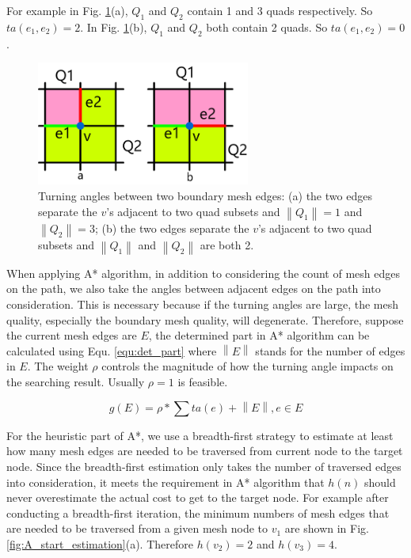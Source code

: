 \documentclass[final,5p,times,twocolumn]{elsarticle}
\begin{document}
For example  in Fig. \ref{fig:turning_angle}(a), $Q_1$ and $Q_2$ contain 1 and 3 quads respectively. So $ta(e_1,e_2)=2$. In Fig. \ref{fig:turning_angle}(b), $Q_1$ and $Q_2$ both contain 2 quads. So $ta(e_1,e_2)=0$.

\begin{figure}[htbp]
\begin{center}
\includegraphics[width=7cm]{rev_figures/turning_angle.png}
\caption{Turning angles between two boundary mesh edges: (a) the two edges separate the $v$'s adjacent to two quad subsets and $\left \| Q_1 \right \|=1$ and $\left \| Q_2 \right \|=3$; (b) the two edges separate the $v$'s adjacent to two quad subsets and $\left \| Q_1 \right \|$ and $\left \| Q_2 \right \|$ are both 2.}
\label{fig:turning_angle}
\end{center}
\end{figure}

When applying A* algorithm, in addition to considering the count of mesh edges on the path, we also take the angles between adjacent edges on the path into consideration. This is necessary because if the turning angles are large, the mesh quality, especially the boundary mesh quality, will degenerate. Therefore, suppose the current mesh edges are $E$, the determined part in A* algorithm can be calculated using Equ. \ref{equ:det_part} where $\left \| E \right \|$ stands for the number of edges in $E$. The weight $\rho $ controls the magnitude of how the turning angle impacts on the searching result. Usually $\rho =1$ is feasible.

\begin{equation}
\label{equ:det_part}
g(E) = \rho * \sum ta(e) + \left \| E \right \|, e \in E
\end{equation}

For the heuristic part of A*, we use a breadth-first strategy to estimate at least how many mesh edges are needed to be traversed from current node to the target node. Since the breadth-first estimation only takes the number of traversed edges into consideration, it meets the requirement in A* algorithm that $h(n)$ should never overestimate the actual cost to get to the target node. For example after conducting a breadth-first iteration, the minimum numbers of mesh edges that are needed to be traversed from a given mesh node to $v_1$ are shown in Fig. \ref{fig:A_start_estimation}(a). Therefore $h(v_2)=2$ and $h(v_3)=4$.
\end{document}
